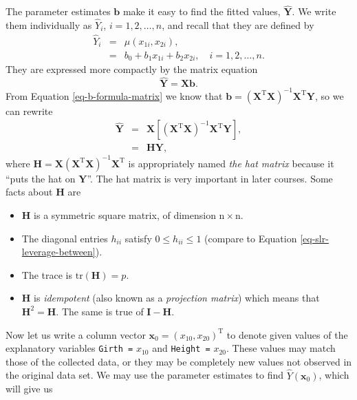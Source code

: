 \documentclass[captions=tableheading]{scrbook}
\begin{document}
The parameter estimates \(\mathbf{b}\) make it easy to find the fitted values, \(\hat{\mathbf{Y}}\). We write them individually as \(\hat{Y}_{i}\), \(i=1,2,\ldots,n\), and recall that they are defined by
\begin{eqnarray}
\hat{Y}_{i} & = & \hat{\mu}(x_{1i},x_{2i}),\\
 & = & b_{0}+b_{1}x_{1i}+b_{2}x_{2i},\quad i=1,2,\ldots,n.
\end{eqnarray}
They are expressed more compactly by the matrix equation
\begin{equation}
\hat{\mathbf{Y}}=\mathbf{X}\mathbf{b}.
\end{equation}
From Equation \ref{eq-b-formula-matrix} we know that \(\mathbf{b}=\left(\mathbf{X}^{\mathrm{T}}\mathbf{X}\right)^{-1}\mathbf{X}^{\mathrm{T}}\mathbf{Y}\), so we can rewrite
\begin{eqnarray}
\hat{\mathbf{Y}} & = & \mathbf{X}\left[\left(\mathbf{X}^{\mathrm{T}}\mathbf{X}\right)^{-1}\mathbf{X}^{\mathrm{T}}\mathbf{Y}\right],\\
 & = & \mathbf{H}\mathbf{Y},
\end{eqnarray}
where \(\mathbf{H}=\mathbf{X}\left(\mathbf{X}^{\mathrm{T}}\mathbf{X}\right)^{-1}\mathbf{X}^{\mathrm{T}}\) is appropriately named \emph{the hat matrix} because it ``puts the hat on \(\mathbf{Y}\)''. The hat matrix is very important in later courses. Some facts about \(\mathbf{H}\) are
\begin{itemize}
\item \(\mathbf{H}\) is a symmetric square matrix, of dimension \(\mathrm{n}\times\mathrm{n}\).
\item The diagonal entries \(h_{ii}\) satisfy \(0\leq h_{ii}\leq1\) (compare to Equation \ref{eq-slr-leverage-between}).
\item The trace is \(\mathrm{tr}(\mathbf{H})=p\).
\item \(\mathbf{H}\) is \emph{idempotent} (also known as a \emph{projection matrix}) which means that \(\mathbf{H}^{2}=\mathbf{H}\). The same is true of \(\mathbf{I}-\mathbf{H}\).
\end{itemize}

Now let us write a column vector \(\mathbf{x}_{0}=(x_{10},x_{20})^{\mathrm{T}}\) to denote given values of the explanatory variables \texttt{Girth =} \(x_{10}\) and \texttt{Height =} \(x_{20}\). These values may match those of the collected data, or they may be completely new values not observed in the original data set. We may use the parameter estimates to find \(\hat{Y}(\mathbf{x}_{0})\), which will give us
\end{document}
